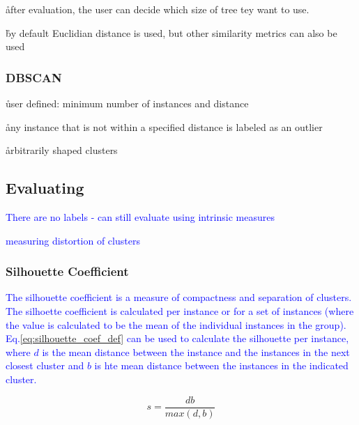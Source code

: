 

\r{after evaluation, the user can decide which size of tree tey want to use.}

\r{by default Euclidian distance is used, but other similarity metrics can also be used }


\subsubsection{DBSCAN}


\r{user defined: minimum number of instances and distance}

\r{any instance that is not within a specified distance is labeled as an outlier}

\r{arbitrarily shaped clusters}




\subsection{Evaluating}

\textcolor{blue}{There are no labels - can still evaluate using intrinsic measures}

\textcolor{blue}{measuring distortion of clusters}

\subsubsection{Silhouette Coefficient}

\textcolor{blue}{The {silhouette coefficient} is a measure of compactness and separation of clusters. The silhoette coefficient is calculated per instance or for a set of instances (where the value is calculated to be the mean of the individual instances in the group). Eq.\ref{eq:silhouette_coef_def} can be used to calculate the silhouette per instance, where $d$ is the mean distance between the instance and the instances in the next closest cluster and $b$ is hte mean distance between the instances in the indicated cluster.}

\begin{equation}
{s = \frac{db}{max(d,b)}}
\label{eq:silhouette_coef_def}
\end{equation}





